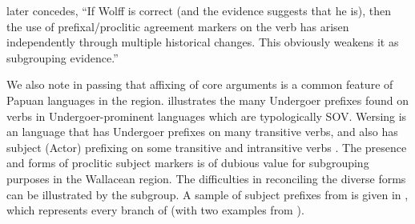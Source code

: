 \citet[59]{Blust2009} later concedes,
“If Wolff is correct (and the evidence suggests that he is),
then the use of prefixal/proclitic agreement markers on the verb
has arisen independently through multiple historical changes.
This obviously weakens it as subgrouping evidence.”

We also note in passing that affixing of core arguments is a
common feature of Papuan languages in the region.
\citet{Klamer2017} illustrates the many Undergoer prefixes found
on verbs in Undergoer-prominent  languages which are typologically SOV.
Wersing is an  language that has Undergoer prefixes
on many transitive verbs,
and also has subject (Actor) prefixing on some transitive
and intransitive verbs \citep{Jones2023}. 
The presence and forms of proclitic subject markers is of dubious
value for subgrouping purposes in the Wallacean region.
The difficulties in reconciling the diverse forms can be illustrated
by the  subgroup.
A sample of subject prefixes from  is given
in , which represents every branch of  (with two
examples from ).

